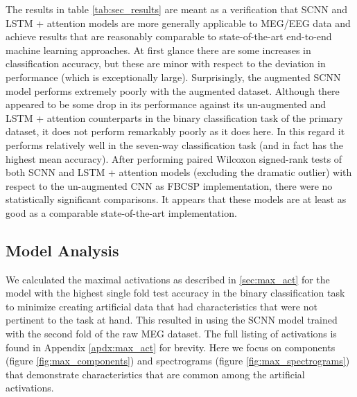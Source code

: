 \documentclass[fleqn,10pt]{wlscirep}
\begin{document}
The results in table \ref{tab:sec_results} are meant as a verification that SCNN and LSTM + attention models are more generally applicable to MEG/EEG data and achieve results that are reasonably comparable to state-of-the-art end-to-end machine learning approaches. At first glance there are some increases in classification accuracy, but these are minor with respect to the deviation in performance (which is exceptionally large). Surprisingly, the augmented SCNN model performs extremely poorly with the augmented dataset. Although there appeared to be some drop in its performance against its un-augmented and LSTM + attention counterparts in the binary classification task of the primary dataset, it does not perform remarkably poorly as it does here. In this regard it performs relatively well in the seven-way classification task (and in fact has the highest mean accuracy). After performing paired Wilcoxon signed-rank tests of both SCNN and LSTM + attention models (excluding the dramatic outlier) with respect to the un-augmented CNN as FBCSP implementation, there were no statistically significant comparisons. It appears that these models are at least as good as a comparable state-of-the-art implementation.

\subsection*{Model Analysis}

We calculated the maximal activations as described in \ref{sec:max_act} for the model with the highest single fold test accuracy in the binary classification task to minimize creating artificial data that had characteristics that were not pertinent to the task at hand. This resulted in using the SCNN model trained with the second fold of the raw MEG dataset. The full listing of activations is found in Appendix \ref{apdx:max_act} for brevity. Here we focus on components (figure \ref{fig:max_components}) and spectrograms (figure \ref{fig:max_spectrograms}) that demonstrate characteristics that are common among the artificial activations.
\end{document}
